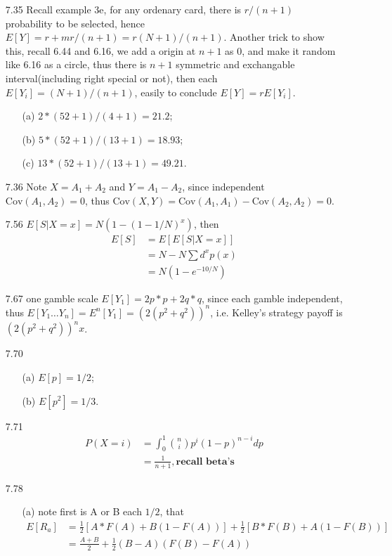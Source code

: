 \documentclass[paper=a4, fontsize=11pt]{scrartcl} %
\numberwithin{equation}{section} %
\numberwithin{figure}{section} %
\numberwithin{table}{section} %
\def \cov {\text{Cov}}
\begin{document}
\begin{itemize}
	\item[7.35] Recall example 3e, for any ordenary card, there is $r/(n+1)$ probability to be selected, hence $E[Y]=r+mr/(n+1) = r(N+1)/(n+1)$. Another trick to show this, recall 6.44 and 6.16, we add a origin at $n+1$ as $0$, and make it random like 6.16 as a circle, thus there is $n+1$ symmetric and exchangable interval(including right special or not), then each $E[Y_i]=(N+1)/(n+1)$, easily to conclude $E[Y]=r E[Y_i]$.
	\begin{itemize}
		\item[(a)] $2*(52+1)/(4+1) = 21.2$;
		\item[(b)] $5*(52+1)/(13+1) = 18.93$;
		\item[(c)] $13*(52+1)/(13+1) = 49.21$.
	\end{itemize}
	\item[7.36] Note $X=A_1+A_2$ and $Y=A_1-A_2$, since independent $\cov(A_1,A_2)=0$, thus $\cov(X,Y) = \cov(A_1,A_1) -\cov(A_2,A_2)=0$.
	\item[7.56] $E[S|X=x] = N(1-(1-1/N)^x)$, then
	\begin{align}
		E[S] &= E[E[S|X=x]] \\
			&= N - N \sum d^x p(x)\\
			&= N(1- e^{-10/N})
	\end{align}
	\item[7.67] one gamble scale $E[Y_1]= 2p*p+2q*q$, since each gamble independent, thus $E[Y_1\dots Y_n] = E^n[Y_1] = (2(p^2+q^2))^n$, i.e. Kelley's strategy payoff is $(2(p^2+q^2))^nx$.
	\item[7.70]
	\begin{itemize}
		\item[(a)] $E[p] = 1/2$;
		\item[(b)] $E[p^2] = 1/3$.
	\end{itemize}
	\item[7.71]
	\begin{align}
		P(X=i) &= \int_0^1 {n\choose i} p^i (1-p)^{n-i} dp \\
			&= \frac{1}{n+1}, \textbf{recall beta's}
	\end{align}
	\item[7.78]
	\begin{itemize}
		\item[(a)] note first is A or B each $1/2$, that
		\begin{align}
			E[R_a] &= \frac{1}{2}[A*F(A)+ B(1-F(A))] + \frac{1}{2}[B*F(B)+A(1-F(B))]\\
				&= \frac{A+B}{2} + \frac{1}{2}(B-A)(F(B)-F(A))\\

\end{align}
\end{itemize}
\end{itemize}
\end{document}

